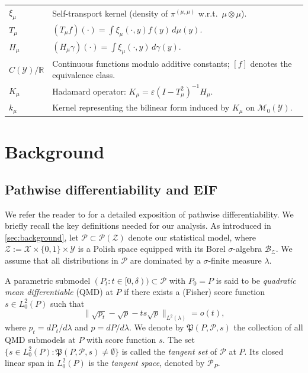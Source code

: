 \documentclass{article}
\theoremstyle{plain}
\theoremstyle{definition}
\theoremstyle{remark}
\newcommand{\cZ}{\mathcal{Z}}
\newcommand{\cP}{\mathcal{P}}
\newcommand{\cB}{\mathcal{B}}
\newcommand{\cM}{\mathcal{M}}
\newcommand{\cY}{\mathcal{Y}}
\newcommand{\cX}{\mathcal{X}}
\newcommand{\fP}{\mathfrak{P}}
\newcommand{\1}{\mathbbm{1}}
\theoremstyle{plain}
\theoremstyle{definition}
\begin{document}
\begin{center}
\begin{small}
\begin{longtable}{@{}ll@{}}
            
            $\xi_\mu$ & Self-transport kernel (density of $\pi^{(\mu,\mu)}$ w.r.t.\ $\mu\otimes\mu$). \\
            $T_\mu$  & $(T_\mu f)(\cdot)=\int \xi_\mu(\cdot,y)f(y)\,d\mu(y)$. \\
            $H_\mu$ & $(H_\mu\gamma)(\cdot)=\int \xi_\mu(\cdot,y)\,d\gamma(y)$. \\
            $C(\mathcal Y)/\mathbb R$ & Continuous functions modulo additive constants; $[f]$ denotes the equivalence class. \\
            $K_\mu$ & Hadamard operator: $K_\mu=\varepsilon(I-T_\mu^2)^{-1}H_\mu$. \\
            $k_\mu$ &  Kernel representing the bilinear form induced by $K_\mu$ on $\cM_0(\cY)$. \\
            
%
\end{longtable}
\end{small}
\end{center}

\section{Background} \label{appendix:background}
\subsection{Pathwise differentiability and EIF}\label{appendix:eif}

We refer the reader to \citet{luedtke2024one} for a detailed exposition of pathwise differentiability. We briefly recall the key definitions needed for our analysis.
As introduced in \cref{sec:background}, let $\cP \subset \cP(\cZ)$ denote our statistical model, where $\cZ := \cX \times \{0,1\} \times \cY$ is a Polish space equipped with its Borel $\sigma$-algebra $\cB_\cZ$. We assume that all distributions in $\cP$ are dominated by a $\sigma$-finite measure $\lambda$. 

A parametric submodel $(P_t : t \in [0,\delta)) \subset \cP$ with $P_0 = P$ is said to be \emph{quadratic mean differentiable} (QMD) at $P$ if there exists a (Fisher) score function $s \in L_0^2(P)$ such that
\[
\big\| \sqrt{p_t} - \sqrt{p} - t s \sqrt{p} \big\|_{L^2(\lambda)} = o(t),
\]
where $p_t = dP_t/d\lambda$ and $p = dP/d\lambda$. We denote by $\fP(P,\cP,s)$ the collection of all QMD submodels at $P$ with score function $s$. The set $\{ s \in L_0^2(P) : \fP(P,\cP,s) \neq \emptyset \}$ is called the \emph{tangent set} of $\cP$ at $P$. Its closed linear span in $L_0^2(P)$ is the \emph{tangent space}, denoted by $\dot{\cP}_P$.
\end{document}
